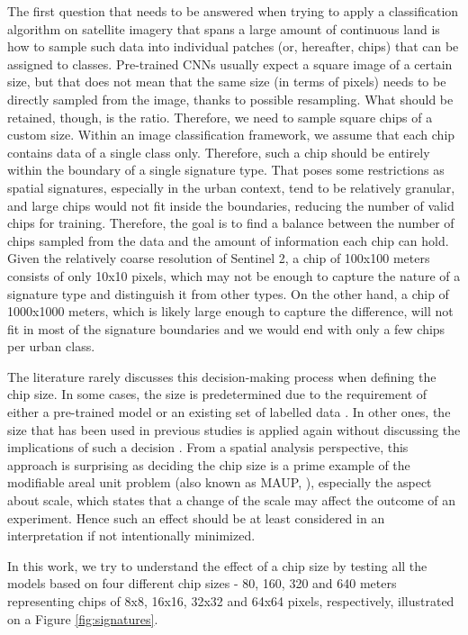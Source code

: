 \documentclass[]{interact}
\theoremstyle{plain}%
\theoremstyle{definition}
\theoremstyle{remark}
\begin{document}
The first question that needs to be answered when trying to apply a classification
algorithm on satellite imagery that spans a large amount of continuous land is how
to sample such data into individual patches (or, hereafter, chips)
that can be assigned to classes. Pre-trained CNNs usually expect a square image of
a certain size, but that does not mean that the same size (in terms of pixels) needs to
be directly sampled from the image, thanks to possible resampling. What should be
retained, though, is the ratio. Therefore, we need to sample square chips of a
custom size. Within an image classification framework, we assume that
each chip contains data of a single class only. Therefore, such a chip should be entirely
within the boundary of a single signature type. That poses some restrictions as spatial
signatures, especially in the urban context, tend to be relatively granular, and large chips
would not fit inside the boundaries, reducing the number of
valid chips for training. Therefore, the goal is to find a balance
between the number of chips sampled from the data and the amount of
information each chip can hold. Given the relatively coarse resolution of Sentinel 2, a
chip of 100x100 meters consists of only 10x10 pixels, which may not be enough to capture
the nature of a signature type and distinguish it from other types. On the other hand, a
chip of 1000x1000 meters, which is likely large enough to capture the difference, will
not fit in most of the signature boundaries and we would end with only a few chips per
urban class.

The literature rarely discusses this decision-making process when defining the chip
size. In some cases, the size is predetermined due to the requirement of either a
pre-trained model or an existing set of labelled data \citep{taubenbock2020}. In
other ones, the size that has
been used in previous studies is applied again without discussing the implications
of such a decision \citep{wang2018mapping}. From a spatial analysis
perspective, this approach is surprising as deciding the chip size is a prime example of the
modifiable areal unit problem (also known as MAUP,
\citealp{openshaw1981modifiable}), especially the aspect about scale, which states that
a change of the scale may affect the outcome of an experiment. Hence such an effect
should be at least considered in an interpretation if not intentionally minimized.

In this work, we try to understand the effect of a chip size by testing all the models
based on four different chip sizes - 80, 160, 320 and 640 meters representing chips of
8x8, 16x16, 32x32 and 64x64 pixels, respectively, illustrated on a Figure \ref{fig:signatures}.
\end{document}
